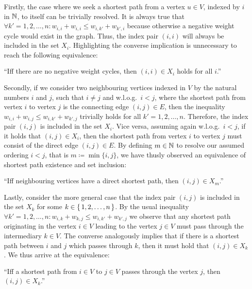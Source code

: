 Firstly, the case where we seek a shortest path from a vertex $u \in V$, indexed by $i$ in $\mathbb{N}$, to itself can be trivially resolved.
It is always true that $\forall k' = 1, 2, \dots, n: w_{i, i} + w_{i, i} \leq w_{i, k'} + w_{k', i}$ because otherwise a negative weight cycle would exist in the graph.
Thus, the index pair $(i, i)$ will always be included in the set $X_i$.
Highlighting the converse implication is unnecessary to reach the following equivalence:
\begin{displayquote}
    ``Iff there are no negative weight cycles, then $(i, i) \in X_i$ holds for all $i$.''
\end{displayquote}

Secondly, if we consider two neighbouring vertices indexed in $V$ by the natural numbers $i$ and $j$, such that $i \neq j$ and w.l.o.g.\ $i < j$, where the shortest path from vertex $i$ to vertex $j$ is the connecting edge $(i, j) \in E$, then the inequality $w_{i, i} + w_{i, j} \leq w_{i, k'} + w_{k', j}$ trivially holds for all $k' = 1, 2, \dots, n$.
Therefore, the index pair $(i, j)$ is included in the set $X_i$.
Vice versa, assuming again w.l.o.g.\ $i < j$, if it holds that $(i, j) \in X_i$, then the shortest path from vertex $i$ to vertex $j$ must consist of the direct edge $(i, j) \in E$.
By defining $m \in \mathbb{N}$ to resolve our assumed ordering $i < j$, that is $m \coloneqq \min \{ i, j \}$, we have thusly observed an equivalence of shortest path existence and set inclusion:
\begin{displayquote}
    ``Iff neighbouring vertices have a direct shortest path, then $(i, j) \in X_m$.''
\end{displayquote}

Lastly, consider the more general case that the index pair $(i, j)$ is included in the set $X_k$ for some $k \in \left\{\,1, 2, \dots, n\,\right\}$.
By the usual inequality $\forall k' = 1, 2, \dots, n: w_{i, k} + w_{k, j} \leq w_{i, k'} + w_{k', j}$ we observe that any shortest path originating in the vertex $i \in V$ leading to the vertex $j \in V$ must pass through the intermediary $k \in V$.
The converse analogously implies that if there is a shortest path between $i$ and $j$ which passes through $k$, then it must hold that $(i, j) \in X_k$.
We thus arrive at the equivalence:
\begin{displayquote}
    ``Iff a shortest path from $i \in V$ to $j \in V$ passes through the vertex $j$, then $(i, j) \in X_k$.''
\end{displayquote}

